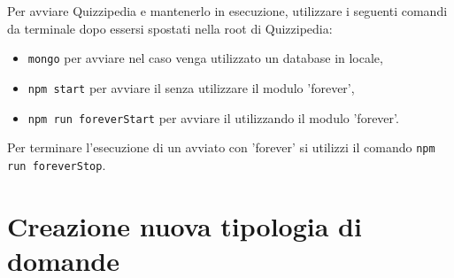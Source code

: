 \documentclass[a4paper, titlepage]{article}
\begin{document}
	Per avviare Quizzipedia e mantenerlo in esecuzione, utilizzare i seguenti comandi da terminale dopo essersi spostati nella root di Quizzipedia:
	\begin{itemize}
		\item \texttt{mongo} per avviare  nel caso venga utilizzato un database in locale,
		\item \texttt{npm start} per avviare il  senza utilizzare il modulo 'forever',
		\item \texttt{npm run foreverStart} per avviare il  utilizzando il modulo 'forever'.
	\end{itemize}
	Per terminare l'esecuzione di un  avviato con 'forever' si utilizzi il comando \texttt{npm run foreverStop}.
	
	\newpage
	
	\section{Creazione nuova tipologia di domande}
	
\end{document}
